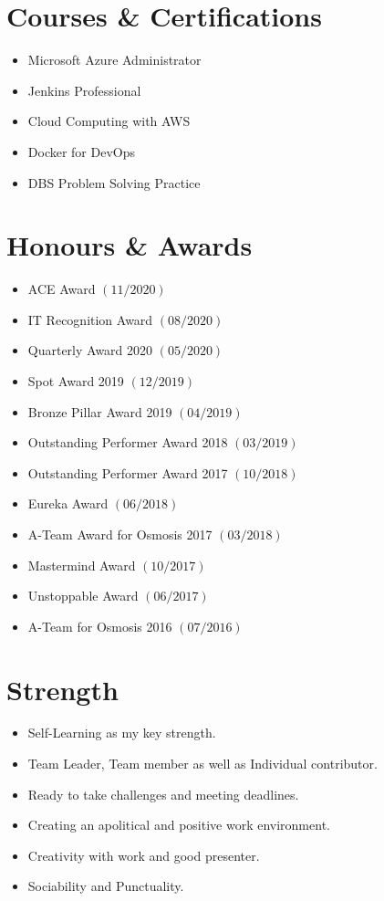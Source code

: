 \documentclass[11pt, a4paper]{article}
\begin{document}
\section*{Courses \& Certifications}
\begin{itemize}[noitemsep, nolistsep]
\item Microsoft Azure Administrator
\item Jenkins Professional
\item Cloud Computing with AWS
\item Docker for DevOps
\item DBS Problem Solving Practice
\end{itemize}

\section*{Honours \& Awards}
\begin{itemize}[noitemsep, nolistsep]
\item ACE Award $(11/2020)$
\item IT Recognition Award $(08/2020)$
\item Quarterly Award 2020 $(05/2020)$
\item Spot Award 2019 $(12/2019)$
\item Bronze Pillar Award 2019 $(04/2019)$
\item Outstanding Performer Award 2018 $(03/2019)$
\item Outstanding Performer Award 2017 $(10/2018)$
\item Eureka Award $(06/2018)$
\item A-Team Award for Osmosis 2017 $(03/2018)$
\item Mastermind Award $(10/2017)$
\item Unstoppable Award $(06/2017)$
\item A-Team for Osmosis 2016 $(07/2016)$
\end{itemize}

\section*{Strength}
\begin{itemize}[noitemsep, nolistsep]
\item Self-Learning as my key strength.
\item Team Leader, Team member as well as Individual contributor.
\item Ready to take challenges and meeting deadlines.
\item Creating an apolitical and positive work environment.
\item Creativity with work and good presenter.
\item Sociability and Punctuality.
\end{itemize}
\end{document}
